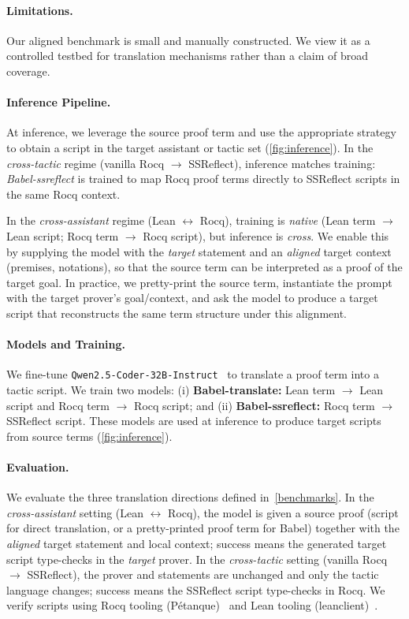 \documentclass{article}
\theoremstyle{plain}
\theoremstyle{definition}
\theoremstyle{remark}
\begin{document}
	\paragraph{Limitations.}
	Our aligned benchmark is small and manually constructed. We view it as a controlled testbed for translation mechanisms rather than a claim of broad coverage.
	
	\paragraph{Inference Pipeline.}
	At inference, we leverage the source proof term and use the appropriate strategy to obtain a script in the target assistant or tactic set (\cref{fig:inference}).
	In the \emph{cross-tactic} regime (vanilla Rocq $\to$ SSReflect), inference matches training: \textit{Babel-ssreflect} is trained to map Rocq proof terms directly to SSReflect scripts in the same Rocq context.
	
	In the \emph{cross-assistant} regime (Lean $\leftrightarrow$ Rocq), training is \emph{native} (Lean term $\to$ Lean script; Rocq term $\to$ Rocq script), but inference is \emph{cross}.
	We enable this by supplying the model with the \emph{target} statement and an \emph{aligned} target context (premises, notations), so that the source term can be interpreted as a proof of the target goal.
	In practice, we pretty-print the source term, instantiate the prompt with the target prover's goal/context, and ask the model to produce a target script that reconstructs the same term structure under this alignment.	
	
	\paragraph{Models and Training.}
	We fine-tune \texttt{Qwen2.5-Coder-32B-Instruct}~\cite{deepseek2024} to translate a proof term into a tactic script. We train two models:
	(i) \textbf{Babel-translate:} Lean term $\to$ Lean script and Rocq term $\to$ Rocq script; and
	(ii) \textbf{Babel-ssreflect:} Rocq term $\to$ SSReflect script.
	These models are used at inference to produce target scripts from source terms (\cref{fig:inference}).
	
	\paragraph{Evaluation.}
	We evaluate the three translation directions defined in~\cref{benchmarks}.
	In the \emph{cross-assistant} setting (Lean $\leftrightarrow$ Rocq), the model is given a source proof (script for direct translation, or a pretty-printed proof term for Babel) together with the \emph{aligned} target statement and local context; success means the generated target script type-checks in the \emph{target} prover.
	In the \emph{cross-tactic} setting (vanilla Rocq $\to$ SSReflect), the prover and statements are unchanged and only the tactic language changes; success means the SSReflect script type-checks in Rocq.
	We verify scripts using Rocq tooling (Pétanque)~\cite{coqlsp,nlir-mathai24} and Lean tooling (leanclient)~\cite{leanclient2025}.
	
\end{document}
